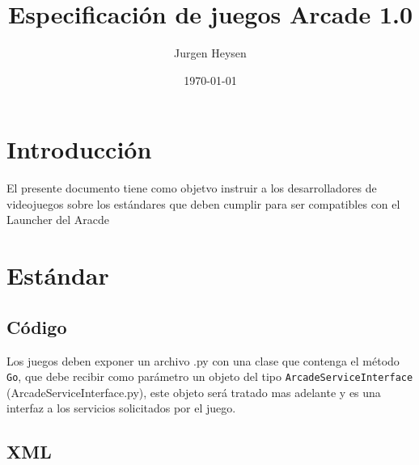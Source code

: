 \documentclass[language=spanish]{article}
\begin{document}
\title{Especificación de juegos Arcade 1.0}
\author{Jurgen Heysen}
\date{\today}
\maketitle
\newpage

\tableofcontents
\newpage

\section{Introducción}

El presente documento tiene como objetvo instruir a los desarrolladores de videojuegos sobre los estándares que deben cumplir para ser compatibles con el Launcher del Aracde

\section{Estándar}

\subsection{Código}

Los juegos deben exponer un archivo .py con una clase que contenga el método {\tt Go}, que debe recibir como parámetro un objeto del tipo {\tt ArcadeServiceInterface} (ArcadeServiceInterface.py), este objeto será tratado mas adelante y es una interfaz a los servicios solicitados por el juego.

\subsection{XML}
\end{document}
